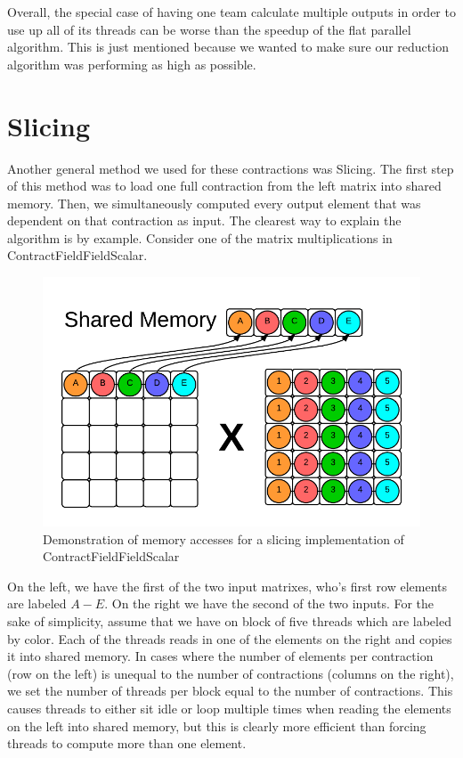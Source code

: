 Overall, the special case of having one team calculate multiple outputs in order to use up all of its threads can be worse than the speedup of the flat parallel algorithm. This is just mentioned because we wanted to make sure our reduction algorithm was performing as high as possible. 

\section{Slicing} \label{slicing}
Another general method we used for these contractions was Slicing. The first step of this method was to load one full contraction from the left matrix into shared memory. Then, we simultaneously computed every output element that was dependent on that contraction as input. The clearest way to explain the algorithm is by example. Consider one of the matrix multiplications in ContractFieldFieldScalar. 

\begin{figure}
    \centering
    \includegraphics[scale = .55]{ContractFieldFieldScalarGraphic}
    \caption{Demonstration of memory accesses for a slicing implementation of ContractFieldFieldScalar}
\end{figure}

	On the left, we have the first of the two input matrixes, who's first row elements are labeled $A-E$. On the right we have the second of the two inputs. For the sake of simplicity, assume that we have on block of five threads which are labeled by color. Each of the threads reads in one of the elements on the right and copies it into shared memory. In cases where the number of elements per contraction (row on the left) is unequal to the number of contractions (columns on the right), we set the number of threads per block equal to the number of contractions. This causes threads to either sit idle or loop multiple times when reading the elements on the left into shared memory, but this is clearly more efficient than forcing threads to compute more than one element.
	

